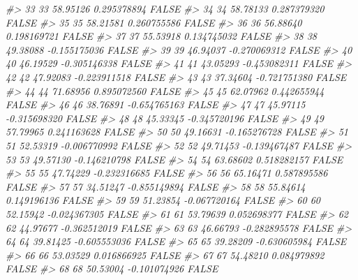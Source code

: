 \documentclass[
  oneside]{book}
\newenvironment{Shaded}{\begin{snugshade}}{\end{snugshade}}
\newcommand{\CommentTok}[1]{\textcolor[rgb]{0.56,0.35,0.01}{\textit{#1}}}
\begin{document}
\begin{Shaded}
\begin{Highlighting}[]
\CommentTok{\#\textgreater{} 33   33  58.95126  0.295378894     FALSE}
\CommentTok{\#\textgreater{} 34   34  58.78133  0.287379320     FALSE}
\CommentTok{\#\textgreater{} 35   35  58.21581  0.260755586     FALSE}
\CommentTok{\#\textgreater{} 36   36  56.88640  0.198169721     FALSE}
\CommentTok{\#\textgreater{} 37   37  55.53918  0.134745032     FALSE}
\CommentTok{\#\textgreater{} 38   38  49.38088 {-}0.155175036     FALSE}
\CommentTok{\#\textgreater{} 39   39  46.94037 {-}0.270069312     FALSE}
\CommentTok{\#\textgreater{} 40   40  46.19529 {-}0.305146338     FALSE}
\CommentTok{\#\textgreater{} 41   41  43.05293 {-}0.453082311     FALSE}
\CommentTok{\#\textgreater{} 42   42  47.92083 {-}0.223911518     FALSE}
\CommentTok{\#\textgreater{} 43   43  37.34604 {-}0.721751380     FALSE}
\CommentTok{\#\textgreater{} 44   44  71.68956  0.895072560     FALSE}
\CommentTok{\#\textgreater{} 45   45  62.07962  0.442655944     FALSE}
\CommentTok{\#\textgreater{} 46   46  38.76891 {-}0.654765163     FALSE}
\CommentTok{\#\textgreater{} 47   47  45.97115 {-}0.315698320     FALSE}
\CommentTok{\#\textgreater{} 48   48  45.33345 {-}0.345720196     FALSE}
\CommentTok{\#\textgreater{} 49   49  57.79965  0.241163628     FALSE}
\CommentTok{\#\textgreater{} 50   50  49.16631 {-}0.165276728     FALSE}
\CommentTok{\#\textgreater{} 51   51  52.53319 {-}0.006770992     FALSE}
\CommentTok{\#\textgreater{} 52   52  49.71453 {-}0.139467487     FALSE}
\CommentTok{\#\textgreater{} 53   53  49.57130 {-}0.146210798     FALSE}
\CommentTok{\#\textgreater{} 54   54  63.68602  0.518282157     FALSE}
\CommentTok{\#\textgreater{} 55   55  47.74229 {-}0.232316685     FALSE}
\CommentTok{\#\textgreater{} 56   56  65.16471  0.587895586     FALSE}
\CommentTok{\#\textgreater{} 57   57  34.51247 {-}0.855149894     FALSE}
\CommentTok{\#\textgreater{} 58   58  55.84614  0.149196136     FALSE}
\CommentTok{\#\textgreater{} 59   59  51.23854 {-}0.067720164     FALSE}
\CommentTok{\#\textgreater{} 60   60  52.15942 {-}0.024367305     FALSE}
\CommentTok{\#\textgreater{} 61   61  53.79639  0.052698377     FALSE}
\CommentTok{\#\textgreater{} 62   62  44.97677 {-}0.362512019     FALSE}
\CommentTok{\#\textgreater{} 63   63  46.66793 {-}0.282895578     FALSE}
\CommentTok{\#\textgreater{} 64   64  39.81425 {-}0.605553036     FALSE}
\CommentTok{\#\textgreater{} 65   65  39.28209 {-}0.630605984     FALSE}
\CommentTok{\#\textgreater{} 66   66  53.03529  0.016866925     FALSE}
\CommentTok{\#\textgreater{} 67   67  54.48210  0.084979892     FALSE}
\CommentTok{\#\textgreater{} 68   68  50.53004 {-}0.101074926     FALSE}

\end{Highlighting}
\end{Shaded}
\end{document}
